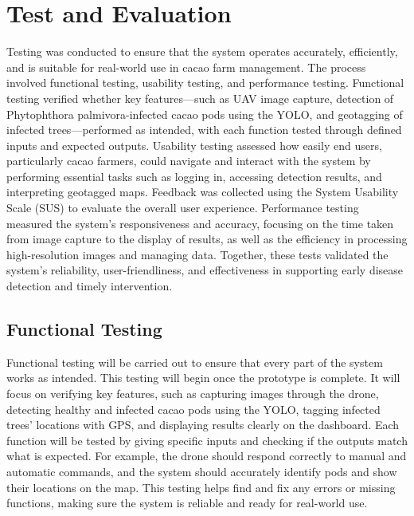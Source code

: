 \section{Test and Evaluation}
Testing was conducted to ensure that the system operates accurately, efficiently, and is suitable for real-world use in cacao farm management. The process involved functional testing, usability testing, and performance testing. Functional testing verified whether key features—such as UAV image capture, detection of Phytophthora palmivora-infected cacao pods using the YOLO, and geotagging of infected trees—performed as intended, with each function tested through defined inputs and expected outputs. Usability testing assessed how easily end users, particularly cacao farmers, could navigate and interact with the system by performing essential tasks such as logging in, accessing detection results, and interpreting geotagged maps. Feedback was collected using the System Usability Scale (SUS) to evaluate the overall user experience. Performance testing measured the system’s responsiveness and accuracy, focusing on the time taken from image capture to the display of results, as well as the efficiency in processing high-resolution images and managing data. Together, these tests validated the system’s reliability, user-friendliness, and effectiveness in supporting early disease detection and timely intervention.

\subsection{Functional Testing}
Functional testing will be carried out to ensure that every part of the system works as intended. This testing will begin once the prototype is complete. It will focus on verifying key features, such as capturing images through the drone, detecting healthy and infected cacao pods using the YOLO, tagging infected trees’ locations with GPS, and displaying results clearly on the dashboard. Each function will be tested by giving specific inputs and checking if the outputs match what is expected. For example, the drone should respond correctly to manual and automatic commands, and the system should accurately identify pods and show their locations on the map. This testing helps find and fix any errors or missing functions, making sure the system is reliable and ready for real-world use.

